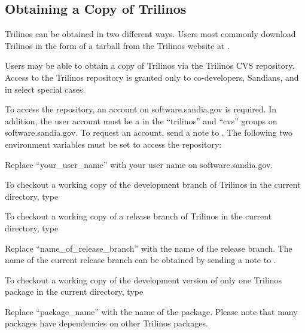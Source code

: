 \documentclass[12pt,relax]{TrilinosUserGuide}
\begin{document}
\subsection{Obtaining a Copy of Trilinos}

Trilinos can be obtained in two different ways.  Users most commonly 
download Trilinos in the form of a tarball from the Trilinos website at 
\newline {}.

Users may be able to obtain a 
copy of Trilinos via the Trilinos CVS repository.  Access to the Trilinos 
repository is granted only to co-developers, Sandians, and in select 
special cases.

To access the repository, an account on software.sandia.gov is required.  In 
addition, the user account must be a in the ``trilinos'' and ``cvs'' groups 
on software.sandia.gov.  To request an account, send a note 
to .  
The following two environment variables must be set to access the repository:


Replace ``your\_user\_name'' with your user name on software.sandia.gov.

To checkout a working copy of the development branch of Trilinos in the 
current directory, type


To checkout a working copy of a release branch of Trilinos in the current 
directory, type


Replace ``name\_of\_release\_branch'' with the name of the release branch.
The name of the current release branch can be obtained by sending a note to
\newline {}.

To checkout a working copy of the development version of only one Trilinos 
package in the current directory, type


Replace ``package\_name'' with the name of the package.  Please note 
that many packages have dependencies on other Trilinos packages.
\end{document}
